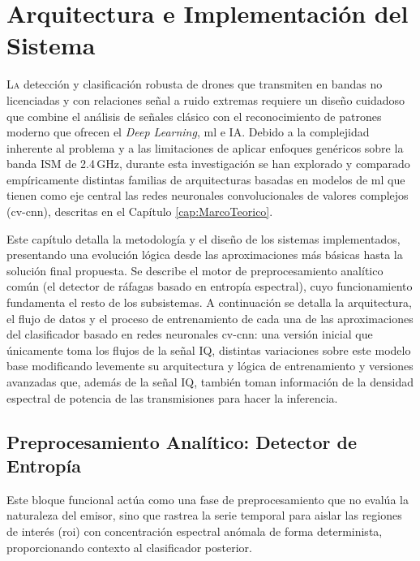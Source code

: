 \chapter{Arquitectura e Implementación del Sistema}
\label{cap:arquitectura}

\lettrine[lraise=-0.1, lines=2, loversize=0.2]{L}{a} detección y clasificación robusta de drones que transmiten en bandas no licenciadas y con relaciones señal a ruido extremas requiere un diseño cuidadoso que combine el análisis de señales clásico con el reconocimiento de patrones moderno que ofrecen el \textit{Deep Learning}, \gls{ml} e IA. Debido a la complejidad inherente al problema y a las limitaciones de aplicar enfoques genéricos sobre la banda ISM de 2.4\,GHz, durante esta investigación se han explorado y comparado empíricamente distintas familias de arquitecturas basadas en modelos de \gls{ml} que tienen como eje central las redes neuronales convolucionales de valores complejos (\gls{cv-cnn}), descritas en el Capítulo \ref{cap:MarcoTeorico}. 


Este capítulo detalla la metodología y el diseño de los sistemas implementados, presentando una evolución lógica desde las aproximaciones más básicas hasta la solución final propuesta. Se describe el motor de preprocesamiento analítico común (el detector de ráfagas basado en entropía espectral), cuyo funcionamiento fundamenta el resto de los subsistemas. A continuación se detalla la arquitectura, el flujo de datos y el proceso de entrenamiento de cada una de las aproximaciones del clasificador basado en redes neuronales \gls{cv-cnn}: una versión inicial que únicamente toma los flujos de la señal IQ, distintas variaciones sobre este modelo base modificando levemente su arquitectura y lógica de entrenamiento y versiones avanzadas que, además de la señal IQ, también toman información de la densidad espectral de potencia de las transmisiones para hacer la inferencia. 

\section{Preprocesamiento Analítico: Detector de Entropía}
\label{sec:preprocesamiento_analitico}

Este bloque funcional actúa como una fase de preprocesamiento que no evalúa la naturaleza del emisor, sino que rastrea la serie temporal para aislar las regiones de interés (\gls{roi}) con concentración espectral anómala de forma determinista, proporcionando contexto al clasificador posterior.

